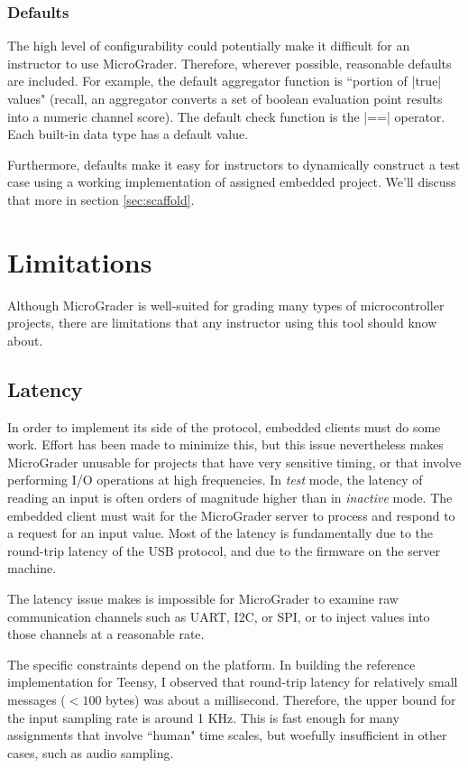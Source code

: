 \documentclass[12pt]{article}
\begin{document}
\subsubsection{Defaults}
The high level of configurability could potentially make it difficult for an instructor to use MicroGrader.  Therefore, wherever possible, reasonable defaults are included.  For example, the default aggregator function is ``portion of |true| values" (recall, an aggregator converts a set of boolean evaluation point results into a numeric channel score).  The default check function is the |==| operator.  Each built-in data type has a default value.

Furthermore, defaults make it easy for instructors to dynamically construct a test case using a working implementation of assigned embedded project.  We'll discuss that more in section \ref{sec:scaffold}.


\newpage
\section{Limitations}
Although MicroGrader is well-suited for grading many types of microcontroller projects, there are limitations that any instructor using this tool should know about.

\subsection{Latency}
In order to implement its side of the protocol, embedded clients must do some work.  Effort has been made to minimize this, but this issue nevertheless makes MicroGrader unusable for projects that have very sensitive timing, or that involve performing I/O operations at high frequencies.  In \textit{test} mode, the latency of reading an input is often orders of magnitude higher than in \textit{inactive} mode.  The embedded client must wait for the MicroGrader server to process and respond to a request for an input value.  Most of the latency is fundamentally due to the round-trip latency of the USB protocol, and due to the firmware on the server machine.

The latency issue makes is impossible for MicroGrader to examine raw communication channels such as UART, I2C, or SPI, or to inject values into those channels at a reasonable rate.

The specific constraints depend on the platform.  In building the reference implementation for Teensy, I observed that round-trip latency for relatively small messages ($<100$ bytes) was about a millisecond.  Therefore, the upper bound for the input sampling rate is around 1 KHz.  This is fast enough for many assignments that involve ``human" time scales, but woefully insufficient in other cases, such as audio sampling.
\end{document}
